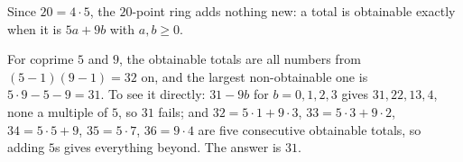 Since $20=4\cdot5$, the $20$-point ring adds nothing new: a total is obtainable exactly when it is $5a+9b$ with $a,b\ge0$.

For coprime $5$ and $9$, the obtainable totals are all numbers from $(5-1)(9-1)=32$ on, and the largest non-obtainable one is $5\cdot9-5-9=31$. To see it directly: $31-9b$ for $b=0,1,2,3$ gives $31,22,13,4$, none a multiple of $5$, so $31$ fails; and $32=5\cdot1+9\cdot3$, $33=5\cdot3+9\cdot2$, $34=5\cdot5+9$, $35=5\cdot7$, $36=9\cdot4$ are five consecutive obtainable totals, so adding $5$s gives everything beyond. The answer is $\boxed{31}$.
